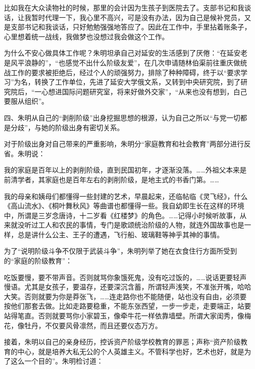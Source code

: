 \begin{quoting}
比如我在大众读物社的时候，那里的会计因为生孩子到医院去了。支部书记和我谈话，让我暂时代理一下，我心里不高兴，可是没有办法，因为自己是候补党员，又是支部书记和我谈话，只好勉勉强强地答应了。因此在工作中，手里拈着账条子，心里想着统一战线，我做梦也没想过我会做这个工作。
\end{quoting}

为什么不安心做具体工作呢？朱明坦承自己对延安的生活感到了厌倦：“在延安老是风平浪静的”，“也感觉不出什么阶级友爱”，在几次申请随林伯渠前往重庆做统战工作的要求被拒绝后，经过个人的顽强努力，排除了种种障碍，终于以“要求学习”为名，转换了工作单位，先进了延安大学俄文系，又转到中央研究院，到了研究院后，“一心想进国际问题研究室，将来好做外交家”，“从来也没有想到，白己要服从组织”。

四、朱明从自己的“剥削阶级”出身挖掘思想的根源，认为自己之所以“与党一切都是分歧”，与她的阶级出身有密切关系。

对于阶级出身对自己带来的严重影响，朱明分“家庭教育和社会教育”两部分进行反省。朱明说：

\begin{quoting}
我的家庭是百年以上的剥削阶级，直到民国初年，才逐渐没落。……外祖父本来是前清学者，其家庭也是百年左右的剥削阶级，是地主式的书香门第。……

我的母亲和姨母们都懂得一些封建的艺术，早晨起来，还临帖临《灵飞经》，什么《高山流水》、《桐叶舞秋风》等曲谱也都懂得一些。我自幼即生长在这样的环境中，所谓是三岁念唐诗，十二岁看《红楼梦》的角色。……记得小时候听故事，从来就没听过工人和农民的事情，专门是歌颂统治阶级的人物，就连外国故事也是一样，总是讲什么公主、王子的遭遇，飞行船、玻璃鞋等神乎其神的事情。
\end{quoting}

为了“说明阶级斗争不仅限于武装斗争”，朱明列举了她在衣食住行方面所受到的“家庭的阶级教育”：

\begin{quoting}
吃饭要慢，要不带声音。否则就骂你象饿死鬼，没有吃过饭的，……说话更要轻声慢语。尤其是女孩子，要温存，还要深沉含蓄，所谓轻声浅笑，不准张开嘴，哈哈大笑。否则就要为你是莽张飞，……连走路你也不能随便，站也没有自由，必须要按他们那套去做。比如走路要稳重，不能东张西望，一步一步走，走要端正，站要站得笔直。否则就要骂你小家碧玉，像牵牛花一样依靠墙壁。所谓大家闺秀，像梅花，像牡丹，不仅要风骨凛然，而且还要仪态万方。
\end{quoting}

接着，朱明以自己的亲身经历，控诉资产阶级学校教育的罪恶；声称“资产阶级教育的中心，就是培养大私无公的个人英雄主义。不管科学也好，艺术也好，就是为了这么一个目的”。朱明检讨道：

